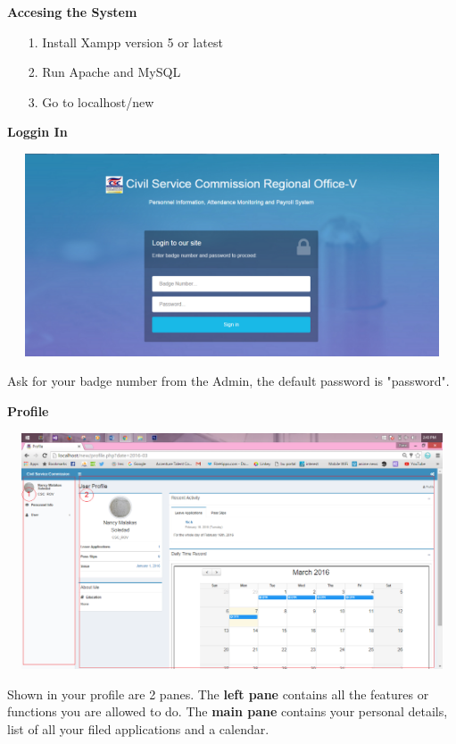 \begin{center} 
	\textbf{}
\end{center}

\noindent
\textbf{Accesing the System}
\begin{enumerate}
	\item[1.] Install Xampp version 5 or latest
	\item[2.] Run Apache and MySQL
	\item[3.] Go to localhost/new
\end{enumerate}

\noindent
\textbf{Loggin In \\}
\begin{center}
	\includegraphics[width=15cm,height=6cm]{image/login.png}
\end{center}

Ask for your badge number from the Admin, the default password is "password".

\newpage
\noindent
\textbf{ Profile \\}
\begin{center}
	\includegraphics[width=15cm,height=7cm]{image/profile_user.png}
\end{center}

Shown in your profile are 2 panes. The \textbf{left pane} contains all the features or functions you are allowed to do. The \textbf{main pane} contains your personal details, list of all your filed applications and a calendar.

